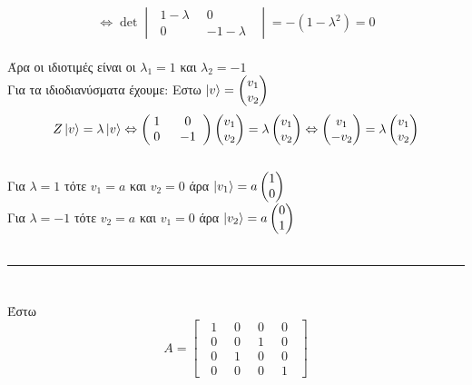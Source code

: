 \documentclass[12pt]{article}
\begin{document}
$$ \Leftrightarrow\det \begin{vmatrix}\;1-\lambda \;\; & 0 \;\;\\ \;0 \;\; & -1-\lambda \;\;\end{vmatrix} = -(1-\lambda^2 )=0 $$ \\
Άρα οι ιδιοτιμές είναι οι $\lambda_1 = 1$ και $\lambda_2=-1$ \\
Για τα ιδιοδιανύσματα έχουμε:
Εστω $\ket{v}=\begin{pmatrix} v_1 \\ v_2\end{pmatrix}$
$$Z\ket{v}=\lambda\ket{ v} \Leftrightarrow \begin{pmatrix}\;1 \;\; & 0 \;\;\\ \;0 \;\; & -1 \;\;\end{pmatrix}\begin{pmatrix} v_1 \\ v_2\end{pmatrix}=\lambda\begin{pmatrix} v_1 \\ v_2\end{pmatrix} \Leftrightarrow 
\begin{pmatrix} v_1 \\ -v_2\end{pmatrix} = \lambda \begin{pmatrix} v_1 \\ v_2\end{pmatrix}$$\\
Για $\lambda =1 $ τότε $v_1=a$ και $v_2 =0 $ άρα $\ket{v_1} = a\begin{pmatrix} 1 \\ 0 \end{pmatrix}$\\
Για $\lambda =-1 $ τότε $v_2=a$ και $v_1 =0 $ άρα $\ket{v_2} = a\begin{pmatrix} 0 \\ 1 \end{pmatrix}$ \\
\\\rule{\textwidth}{.5pt}
\section*{{}}


Έστω $$A = \begin{bmatrix} \;\;1 &\;\; 0 &\;\; 0&\;\; 0\;\; \\
    \;\;0 &\;\; 0 &\;\; 1&\;\; 0\;\;\\
    \;\;0 &\;\; 1 &\;\; 0&\;\; 0\;\;\\
    \;\;0 &\;\; 0 &\;\; 0&\;\; 1\;\;      \end{bmatrix} $$
\end{document}
